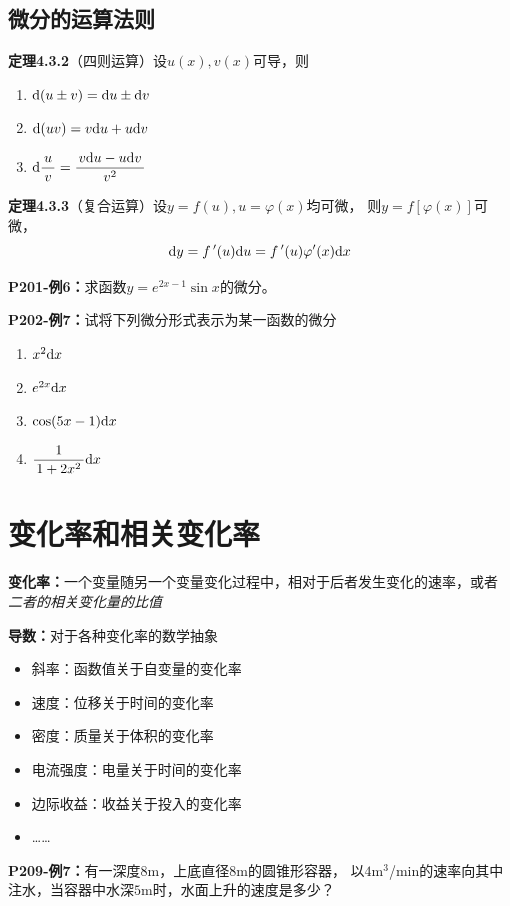 \subsection{微分的运算法则}

{\bf 定理4.3.2}（四则运算）设$u(x),v(x)$可导，则
\begin{enumerate}[(1)]
  \setlength{\itemindent}{1cm}
  \item $\mathrm{d} (u\pm v)=\mathrm{d} u\pm \mathrm{d} v$
  \item $\mathrm{d}(uv)=v\mathrm{d} u+u\mathrm{d} v$
  \item $\mathrm{d}\displaystyle\frac{\,{u}\,}{\,{v}\,}=\displaystyle\frac{\,{v\mathrm{d} u-u\mathrm{d} v}\,}{\,{v^2}\,}$
\end{enumerate}

{\bf 定理4.3.3}（复合运算）设$y=f(u),u=\varphi(x)$均可微，
则$y=f[\varphi(x)]$可微，
$$\mathrm{d} y=f\,'(u)\mathrm{d} u=f\,'(u)\varphi'(x)\mathrm{d} x$$

{\bf P201-例6：}求函数$y=e^{2x-1}\sin x$的微分。

{\bf P202-例7：}试将下列微分形式表示为某一函数的微分 
\begin{enumerate}[(1)]
  \setlength{\itemindent}{1cm}
  \item $x^2\mathrm{d} x$ 
  \item $e^{2x}\mathrm{d} x$ 
  \item $\cos(5x-1)\mathrm{d} x$ 
  \item $\displaystyle\frac{\,{1}\,}{\,{1+2x^2}\,}\mathrm{d} x$
\end{enumerate}

\section{变化率和相关变化率}

{\bf 变化率：}一个变量随另一个变量变化过程中，相对于后者发生变化的速率，或者
{\it 二者的相关变化量的比值}

{\bf 导数：}对于各种变化率的数学抽象

\begin{itemize}
  \setlength{\itemindent}{1cm}
  \item {斜率}：函数值关于自变量的变化率 
  \item {速度}：位移关于时间的变化率 
  \item {密度}：质量关于体积的变化率 
  \item {电流强度}：电量关于时间的变化率 
  \item {边际收益}：收益关于投入的变化率 
  \item {\ldots\ldots} 
\end{itemize}

{\bf P209-例7：}有一深度$8$m，上底直径$8$m的圆锥形容器，
以$4$m$^3$/min的速率向其中注水，当容器中水深$5$m时，水面上升的速度是多少？

